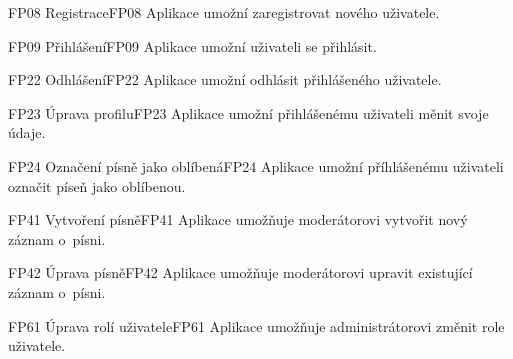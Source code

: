 \begin{requirment}{FP08 Registrace}{FP08}
    Aplikace umožní zaregistrovat nového uživatele.
\end{requirment}

\begin{requirment}{FP09 Přihlášení}{FP09}
    Aplikace umožní uživateli se přihlásit.
\end{requirment}

\begin{requirment}{FP22 Odhlášení}{FP22}
    Aplikace umožní odhlásit přihlášeného uživatele.
\end{requirment}

\begin{requirment}{FP23 Úprava profilu}{FP23}
    Aplikace umožní přihlášenému uživateli měnit svoje údaje.
\end{requirment}


\begin{requirment}{FP24 Označení písně jako oblíbená}{FP24}
    Aplikace umožní příhlášenému uživateli označit píseň jako oblíbenou.
\end{requirment}

\begin{requirment}{FP41 Vytvoření písně}{FP41}
    Aplikace umožňuje moderátorovi vytvořit nový záznam o~písni.
\end{requirment}

\begin{requirment}{FP42 Úprava písně}{FP42}
    Aplikace umožňuje moderátorovi upravit existující záznam o~písni.
\end{requirment}

\begin{requirment}{FP61 Úprava rolí uživatele}{FP61}
    Aplikace umožňuje administrátorovi změnit role uživatele.
\end{requirment}
